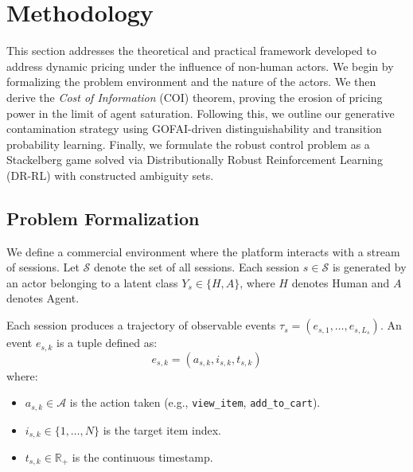 \section{Methodology}
\label{sec:methodology}


This section addresses the theoretical and practical framework developed to address dynamic pricing under the influence of non-human actors. We begin by formalizing the problem environment and the nature of the actors. We then derive the \textit{Cost of Information} (COI) theorem, proving the erosion of pricing power in the limit of agent saturation. Following this, we outline our generative contamination strategy using GOFAI-driven distinguishability and transition probability learning. Finally, we formulate the robust control problem as a Stackelberg game solved via Distributionally Robust Reinforcement Learning (DR-RL) with constructed ambiguity sets.

\subsection{Problem Formalization}

We define a commercial environment where the platform interacts with a stream of sessions. Let $\mathcal{S}$ denote the set of all sessions. Each session $s \in \mathcal{S}$ is generated by an actor belonging to a latent class $Y_s \in \{H, A\}$, where $H$ denotes Human and $A$ denotes Agent.

Each session produces a trajectory of observable events $\tau_s = (e_{s,1}, \ldots, e_{s,L_s})$. An event $e_{s,k}$ is a tuple defined as:
\begin{equation}
e_{s,k} = (a_{s,k}, i_{s,k}, t_{s,k})
\end{equation}
where:
\begin{itemize}
    \item $a_{s,k} \in \mathcal{A}$ is the action taken (e.g., \texttt{view\_item}, \texttt{add\_to\_cart}).
    \item $i_{s,k} \in \{1, \ldots, N\}$ is the target item index.
    \item $t_{s,k} \in \mathbb{R}_+$ is the continuous timestamp.
\end{itemize}

